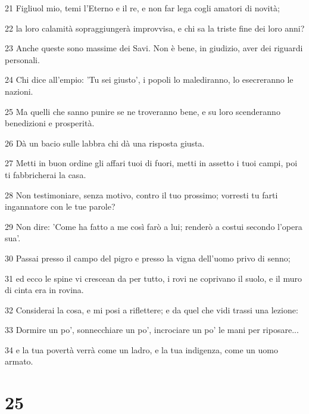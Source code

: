 \par 21 Figliuol mio, temi l'Eterno e il re, e non far lega cogli amatori di novità;
\par 22 la loro calamità sopraggiungerà improvvisa, e chi sa la triste fine dei loro anni?
\par 23 Anche queste sono massime dei Savi. Non è bene, in giudizio, aver dei riguardi personali.
\par 24 Chi dice all'empio: 'Tu sei giusto', i popoli lo malediranno, lo esecreranno le nazioni.
\par 25 Ma quelli che sanno punire se ne troveranno bene, e su loro scenderanno benedizioni e prosperità.
\par 26 Dà un bacio sulle labbra chi dà una risposta giusta.
\par 27 Metti in buon ordine gli affari tuoi di fuori, metti in assetto i tuoi campi, poi ti fabbricherai la casa.
\par 28 Non testimoniare, senza motivo, contro il tuo prossimo; vorresti tu farti ingannatore con le tue parole?
\par 29 Non dire: 'Come ha fatto a me così farò a lui; renderò a costui secondo l'opera sua'.
\par 30 Passai presso il campo del pigro e presso la vigna dell'uomo privo di senno;
\par 31 ed ecco le spine vi crescean da per tutto, i rovi ne coprivano il suolo, e il muro di cinta era in rovina.
\par 32 Considerai la cosa, e mi posi a riflettere; e da quel che vidi trassi una lezione:
\par 33 Dormire un po', sonnecchiare un po', incrociare un po' le mani per riposare...
\par 34 e la tua povertà verrà come un ladro, e la tua indigenza, come un uomo armato.

\chapter{25}

